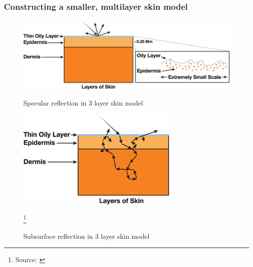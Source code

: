 \documentclass{f4_beamer_metropolis}
\newcommand\blfootnote[1]{%
  \begingroup
  \renewcommand\thefootnote{}\footnote{#1}%
  \addtocounter{footnote}{-1}%
  \endgroup
}
\begin{document}
\begin{frame}[t]
  \frametitle{Constructing a smaller, multilayer skin model}
  \begin{figure}[!h]
    \centering
    \begin{minipage}{.5\textwidth}
      \centering
      \includegraphics[scale=0.5,keepaspectratio]{./images/multilayer-skin-specular-reflection.jpg}
      \caption{Specular reflection in 3 layer skin model}
      \label{fig:test1}
    \end{minipage}%
    \begin{minipage}{.5\textwidth}
      \centering
      \includegraphics[scale=0.5,keepaspectratio]{./images/multilayer-skin-subsurface.jpg}
      \caption{Subsurface reflection in 3 layer skin model}
      \label{fig:test2}
    \end{minipage}
    \blfootnote{Source: \citet{advanced-realtime-skin-rendering}}
  \end{figure}
\end{frame}
\end{document}
